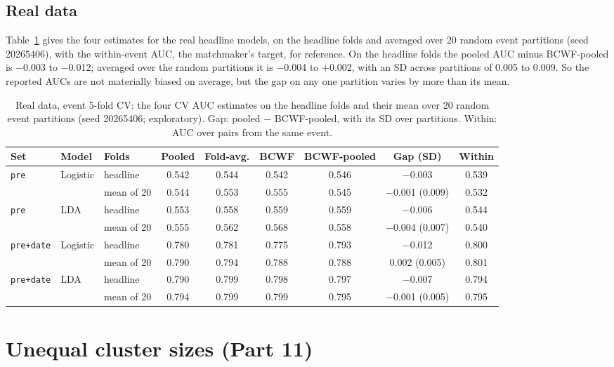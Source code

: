\documentclass[11pt]{amsart}
\theoremstyle{plain}
\theoremstyle{definition}
\theoremstyle{remark}
\begin{document}
\subsection{Real data}
Table~\ref{tab:aucreal} gives the four estimates for the real headline models, on the headline folds and averaged over 20 random event partitions (seed 20265406), with the within-event AUC, the matchmaker's target, for reference. On the headline folds the pooled AUC minus BCWF-pooled is $-$0.003 to $-$0.012; averaged over the random partitions it is $-$0.004 to $+$0.002, with an SD across partitions of 0.005 to 0.009. So the reported AUCs are not materially biased on average, but the gap on any one partition varies by more than its mean.

\begin{table}[tbp]
\centering\footnotesize
\caption{Real data, event 5-fold CV: the four CV AUC estimates on the headline folds and their mean over 20 random event partitions (seed 20265406; exploratory). Gap: pooled $-$ BCWF-pooled, with its SD over partitions. Within: AUC over pairs from the same event.}\label{tab:aucreal}
\begin{tabular}{@{}l l l c c c c c c@{}}
\toprule
Set & Model & Folds & Pooled & Fold-avg. & BCWF & BCWF-pooled & Gap (SD) & Within\\
\midrule
\texttt{pre} & Logistic & headline & 0.542 & 0.544 & 0.542 & 0.546 & $-$0.003 & 0.539 \\
 & & mean of 20 & 0.544 & 0.553 & 0.555 & 0.545 & $-$0.001 (0.009) & 0.532 \\
\addlinespace
\texttt{pre} & LDA & headline & 0.553 & 0.558 & 0.559 & 0.559 & $-$0.006 & 0.544 \\
 & & mean of 20 & 0.555 & 0.562 & 0.568 & 0.558 & $-$0.004 (0.007) & 0.540 \\
\addlinespace
\texttt{pre+date} & Logistic & headline & 0.780 & 0.781 & 0.775 & 0.793 & $-$0.012 & 0.800 \\
 & & mean of 20 & 0.790 & 0.794 & 0.788 & 0.788 & 0.002 (0.005) & 0.801 \\
\addlinespace
\texttt{pre+date} & LDA & headline & 0.790 & 0.799 & 0.798 & 0.797 & $-$0.007 & 0.794 \\
 & & mean of 20 & 0.794 & 0.799 & 0.799 & 0.795 & $-$0.001 (0.005) & 0.795 \\
\bottomrule
\end{tabular}
\end{table}

\section{Unequal cluster sizes (Part 11)}\label{sec:unequal}
\end{document}
